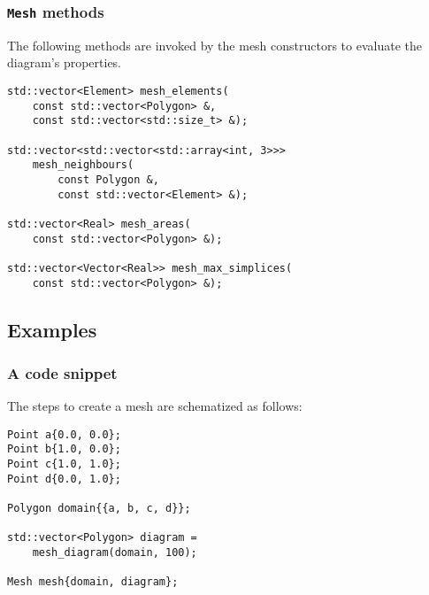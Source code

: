\begin{frame}[fragile]
    \frametitle{\lstinline{Mesh} methods}

    The following methods are invoked by the mesh constructors to evaluate the diagram's properties.

\begin{lstlisting}[style=cpp]
std::vector<Element> mesh_elements(
    const std::vector<Polygon> &, 
    const std::vector<std::size_t> &);

std::vector<std::vector<std::array<int, 3>>> 
    mesh_neighbours(
        const Polygon &, 
        const std::vector<Element> &);

std::vector<Real> mesh_areas(
    const std::vector<Polygon> &);

std::vector<Vector<Real>> mesh_max_simplices(
    const std::vector<Polygon> &);
\end{lstlisting}

\end{frame}

\subsection{Examples}

\begin{frame}[fragile]
    \frametitle{A code snippet}

    The steps to create a mesh are schematized as follows:

\begin{lstlisting}[style=cpp]
Point a{0.0, 0.0};
Point b{1.0, 0.0};
Point c{1.0, 1.0};
Point d{0.0, 1.0};

Polygon domain{{a, b, c, d}};

std::vector<Polygon> diagram = 
    mesh_diagram(domain, 100);

Mesh mesh{domain, diagram};
\end{lstlisting}

\end{frame}

